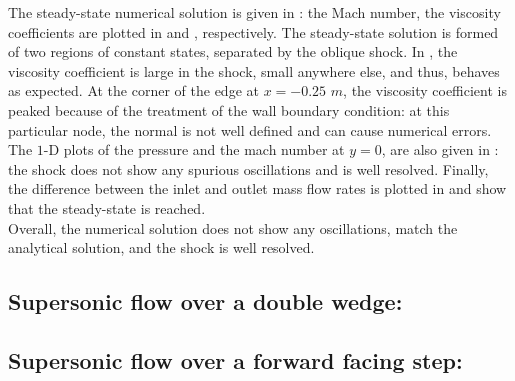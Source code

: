 The steady-state numerical solution is given in : the Mach number, the viscosity coefficients are plotted in  and , respectively. The steady-state solution is formed of two regions of constant states, separated by the oblique shock. In , the viscosity coefficient is large in the shock, small anywhere else, and thus, behaves as expected. At the corner of the edge at $x=-0.25$ $m$, the viscosity coefficient is peaked because of the treatment of the wall boundary condition: at this particular node, the normal is not well defined and can cause numerical errors. The $1$-D plots of the pressure and the mach number at $y=0$, are also given in : the shock does not show any spurious oscillations and is well resolved. Finally, the difference between the inlet and outlet mass flow rates is plotted in  and show that the steady-state is reached. \\
Overall, the numerical solution does not show any oscillations, match the analytical solution, and the shock is well resolved.
\subsection{Supersonic flow over a double wedge:} \label{sec:double_wedge}
\subsection{Supersonic flow over a forward facing step:} \label{sec:forward_facing_step}

